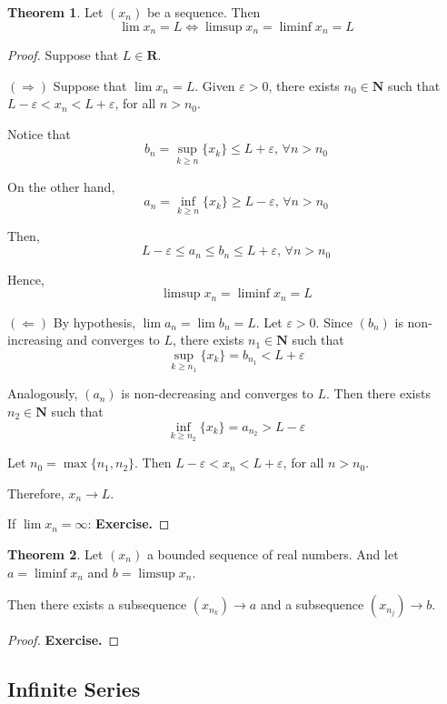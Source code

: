 \documentclass[tikz,12pt,a4paper]{article}
\theoremstyle{definition}
\newtheorem{theorem}{Theorem}[section]
\begin{document}
\begin{theorem}
	Let $(x_n)$ be a sequence. Then
	\[
		\lim x_n = L \iff \limsup x_n = \liminf x_n = L
	\]
\end{theorem}

\begin{proof}
	Suppose that $L \in \textbf{R}$.
	
	$(\Rightarrow)$ Suppose that $\lim x_n = L$. Given $\varepsilon > 0$, there exists $n_0 \in \textbf{N}$ such that $L - \varepsilon < x_n < L + \varepsilon$, for all $n > n_0$.
	
	Notice that
	\[
		b_n = \sup_{k \geq n} \{ x_k \} \leq L + \varepsilon, \, \forall n > n_0
	\]
	
	On the other hand,
	\[
		a_n = \inf_{k \geq n} \{ x_k \} \geq L - \varepsilon, \, \forall n > n_0
	\]
	
	Then,
	\[
		L - \varepsilon \leq a_n \leq b_n \leq L + \varepsilon, \, \forall n > n_0
	\]
	
	Hence,
	\[
		\limsup x_n = \liminf x_n = L
	\]
	
	$(\Leftarrow)$ By hypothesis, $\lim a_n = \lim b_n = L$. Let $\varepsilon > 0$. Since $(b_n)$ is non-increasing and converges to $L$, there exists $n_1 \in \textbf{N}$ such that
	\[
		\sup_{k \geq n_1} \{ x_k \} = b_{n_1} < L + \varepsilon
	\]
	
	Analogously, $(a_n)$ is non-decreasing and converges to $L$. Then there exists $n_2 \in \textbf{N}$ such that  
	\[
		\inf_{k \geq n_2} \{ x_k \} = a_{n_2} > L - \varepsilon
	\]
	
	Let $n_0 = \max \{n_1, n_2 \}$. Then $L - \varepsilon < x_n < L + \varepsilon$, for all $n > n_0$.
	
	Therefore, $x_n \longrightarrow L$.
	
	If $\lim x_n = \infty$: \textbf{Exercise.}
\end{proof}

\begin{theorem}
	Let $(x_n)$ a bounded sequence of real numbers. And let $a = \liminf x_n$ and $b = \limsup x_n$.
	
	Then there exists a subsequence $(x_{n_k}) \longrightarrow a$ and a subsequence $(x_{n_j}) \longrightarrow b$.
\end{theorem}

\begin{proof}
	\textbf{Exercise.}
\end{proof}

\subsection{Infinite Series}
\end{document}
